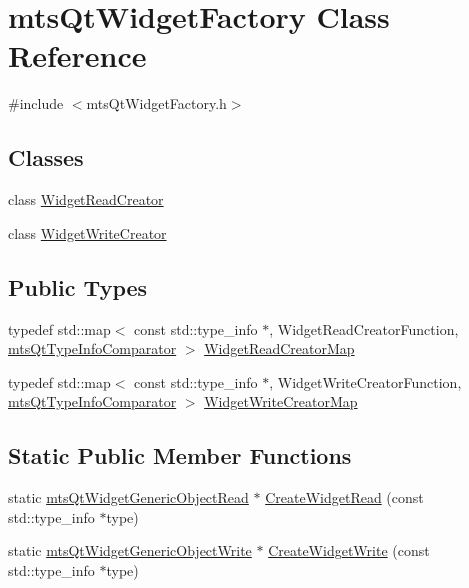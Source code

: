 \hypertarget{classmts_qt_widget_factory}{}\section{mts\+Qt\+Widget\+Factory Class Reference}
\label{classmts_qt_widget_factory}


{\ttfamily \#include $<$mts\+Qt\+Widget\+Factory.\+h$>$}

\subsection*{Classes}
\begin{DoxyCompactItemize}
\item 
class \hyperlink{classmts_qt_widget_factory_1_1_widget_read_creator}{Widget\+Read\+Creator}
\item 
class \hyperlink{classmts_qt_widget_factory_1_1_widget_write_creator}{Widget\+Write\+Creator}
\end{DoxyCompactItemize}
\subsection*{Public Types}
\begin{DoxyCompactItemize}
\item 
typedef std\+::map$<$ const std\+::type\+\_\+info $\ast$, Widget\+Read\+Creator\+Function, \hyperlink{classmts_qt_type_info_comparator}{mts\+Qt\+Type\+Info\+Comparator} $>$ \hyperlink{classmts_qt_widget_factory_a22c882dba48529d554a71443765cb645}{Widget\+Read\+Creator\+Map}
\item 
typedef std\+::map$<$ const std\+::type\+\_\+info $\ast$, Widget\+Write\+Creator\+Function, \hyperlink{classmts_qt_type_info_comparator}{mts\+Qt\+Type\+Info\+Comparator} $>$ \hyperlink{classmts_qt_widget_factory_aa2d044bd78383f0beb1973cbb076d4df}{Widget\+Write\+Creator\+Map}
\end{DoxyCompactItemize}
\subsection*{Static Public Member Functions}
\begin{DoxyCompactItemize}
\item 
static \hyperlink{classmts_qt_widget_generic_object_read}{mts\+Qt\+Widget\+Generic\+Object\+Read} $\ast$ \hyperlink{classmts_qt_widget_factory_a7cc69b831fc2b45023c291479a5d1f09}{Create\+Widget\+Read} (const std\+::type\+\_\+info $\ast$type)
\item 
static \hyperlink{classmts_qt_widget_generic_object_write}{mts\+Qt\+Widget\+Generic\+Object\+Write} $\ast$ \hyperlink{classmts_qt_widget_factory_acd6e5c0627a787519689a1a455cd804d}{Create\+Widget\+Write} (const std\+::type\+\_\+info $\ast$type)
\end{DoxyCompactItemize}
